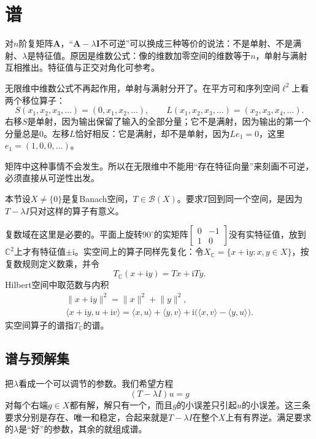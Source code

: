 \section{谱}
\label{sec:ospec-spectrum}

对$n$阶复矩阵$\bm A$，“$\bm A-\lambda\bm I$不可逆”可以换成三种等价的说法：不是单射、不是满射、$\lambda$是特征值。原因是维数公式：像的维数加零空间的维数等于$n$，单射与满射互相推出。特征值与正交对角化可参考。

无限维中维数公式不再起作用，单射与满射分开了。在平方可和序列空间$\ell^2$上看两个移位算子：
\[
S(x_1,x_2,x_3,\ldots)=(0,x_1,x_2,\ldots),\qquad L(x_1,x_2,x_3,\ldots)=(x_2,x_3,x_4,\ldots).
\]
右移$S$是单射，因为输出保留了输入的全部分量；它不是满射，因为输出的第一个分量总是$0$。左移$L$恰好相反：它是满射，却不是单射，因为$Le_1=0$，这里$e_1=(1,0,0,\ldots)$。

矩阵中这种事情不会发生。所以在无限维中不能用“存在特征向量”来刻画不可逆，必须直接从可逆性出发。

本节设$X\neq\{0\}$是复Banach空间，$T\in\mathcal B(X)$。要求$T$回到同一个空间，是因为$T-\lambda I$只对这样的算子有意义。

复数域在这里是必要的。平面上旋转$90^\circ$的实矩阵$\left[\begin{smallmatrix}0&-1\\1&0\end{smallmatrix}\right]$没有实特征值，放到$\mathbb C^2$上才有特征值$\pm\mathrm i$。实空间上的算子同样先复化：令$X_{\mathbb C}=\{x+\mathrm iy:x,y\in X\}$，按复数规则定义数乘，并令
\[
T_{\mathbb C}(x+\mathrm iy)=Tx+\mathrm iTy .
\]
Hilbert空间中取范数与内积
\[
\begin{gathered}
\lVert x+\mathrm iy\rVert^2=\lVert x\rVert^2+\lVert y\rVert^2,\\
\langle x+\mathrm iy,u+\mathrm iv\rangle=\langle x,u\rangle+\langle y,v\rangle+\mathrm i\bigl(\langle x,v\rangle-\langle y,u\rangle\bigr).
\end{gathered}
\]
实空间算子的谱指$T_{\mathbb C}$的谱。

\subsection{谱与预解集}
\label{sec:ospec-resolvent}

把$\lambda$看成一个可以调节的参数。我们希望方程
\[
(T-\lambda I)u=g
\]
对每个右端$g\in X$都有解，解只有一个，而且$g$的小误差只引起$u$的小误差。这三条要求分别是存在、唯一和稳定，合起来就是$T-\lambda I$在整个$X$上有有界逆。满足要求的$\lambda$是“好”的参数，其余的就组成谱。

